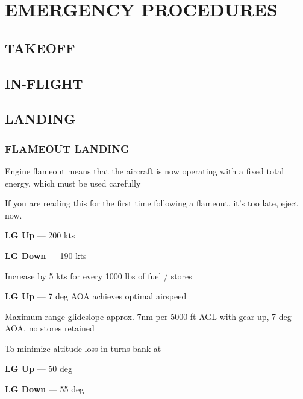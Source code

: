 \chapter[EMERGENCY]{EMERGENCY PROCEDURES}
\localtableofcontents
\thispagestyle{plain}
\cleardoublepage

\marginfigeometry

\section{TAKEOFF}

\section{IN-FLIGHT}

\clearpage

\section{LANDING}

\marginfigrestore

\subsection{FLAMEOUT LANDING}

\begin{tcoloritemize}
    Engine flameout means that the aircraft is now operating with a fixed total energy,
    which must be used carefully

    \medskip
    If you are reading this for the first time following a flameout, 
    it's too late, eject now.

    \textbf{LG Up} --- 200 kts
    
    \medskip
    \textbf{LG Down} --- 190 kts
    
    \bigskip
    Increase by 5 kts for every 1000 lbs of fuel / stores

    \textbf{LG Up} --- 7 deg AOA achieves optimal airspeed

    \blueitem[Glideslope] Maximum range glideslope
    approx. 7nm per 5000 ft AGL with gear up,
    7 deg AOA, no stores retained

    To minimize altitude loss in turns bank at
    
    \medskip
    \textbf{LG Up} --- 50 deg

    \medskip
    \textbf{LG Down} --- 55 deg
\end{tcoloritemize}


